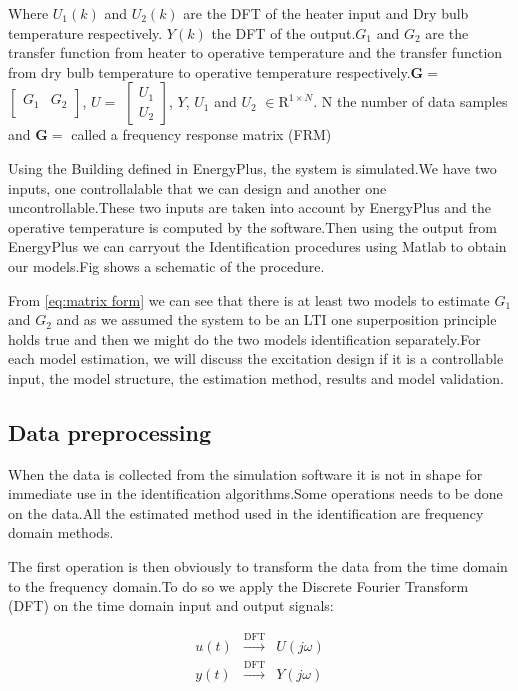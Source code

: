 \documentclass[a4paper,12pt]{article}
\numberwithin{equation}{section}
\begin{document}
\noindent
Where $ U_{1}(k)$ and $ U_{2}(k)$ are the DFT of the heater input and Dry bulb temperature respectively. $Y(k)$ the DFT of the output.$G_{1}$ and $G_{2}$ are the transfer function from heater to operative temperature and the transfer function from dry bulb temperature to operative temperature respectively.$\mathbf{G}=$
 $\begin{bmatrix}
  G_{1} & G_{2}\\ 
\end{bmatrix}$, $U=$
 $\begin{bmatrix}
  U_{1}\\ 
  U_{2}
\end{bmatrix}$, $Y$, $U_{1}$ and $U_{2}$ $\in \mathrm{R}^{1 \times N}$. N the number of data samples and $\mathbf{G}=$ called a frequency response matrix (FRM)

Using the Building defined in EnergyPlus, the system is simulated.We have two inputs, one controllalable that we can design and another one uncontrollable.These two inputs are taken into account by EnergyPlus and the operative temperature is computed by the software.Then using the output from EnergyPlus we can carryout the Identification procedures using Matlab to obtain our models.Fig shows a schematic of the procedure.


From \ref{eq:matrix form} we can see that there is at least two models to estimate $G_{1}$ and $G_{2}$ and as we assumed the system to be an LTI one superposition principle holds true and then we might do the two models identification separately.For each model estimation, we will discuss the excitation design if it is a controllable input, the model structure, the estimation method, results and model validation.

\subsection{Data preprocessing}
When the data is collected from the simulation software it is not in shape for immediate use in the identification algorithms.Some operations needs to be done on the data.All the estimated method used in the identification are frequency domain methods.

The first operation is then obviously to transform the data from the time domain to the frequency domain.To do so we apply the  Discrete Fourier Transform (DFT) on the time domain input and output signals:

\begin{equation}
\begin{array}{rll}
u(t) & \stackrel{\mathrm{DFT}}{\longrightarrow} & U(j \omega) \\
y(t) & \stackrel{\mathrm{DFT}}{\longrightarrow} & Y(j \omega)
\end{array}
\end{equation}
\end{document}

